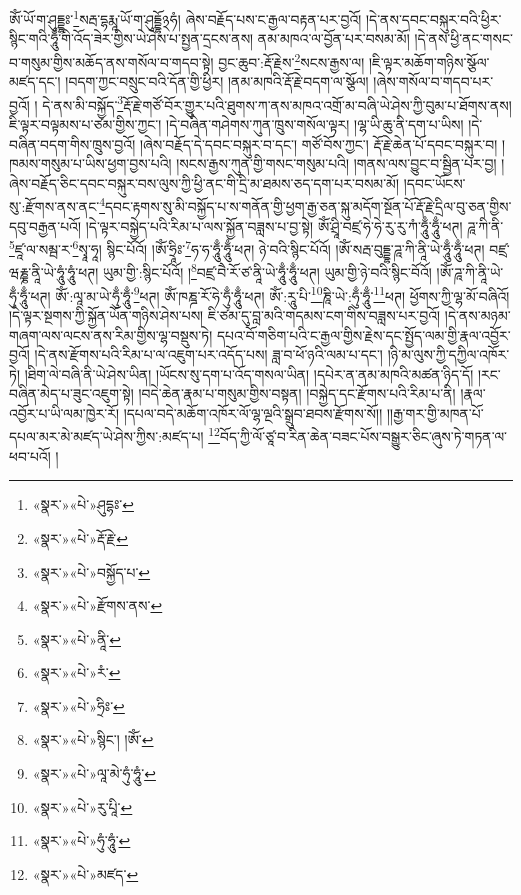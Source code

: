 ཨོཾ་ཡོ་ག་ཤུདྡྷཿ་\footnote{«སྣར་»«པེ་»ཤུདྷཿ་}སརྦ་དྷརྨཱ་ཡོ་ག་ཤུདྡྷོ྅ཧཾ། ཞེས་བརྗོད་པས་ང་རྒྱལ་བརྟན་པར་བྱའོ། །དེ་ནས་དབང་བསྐུར་བའི་ཕྱིར་སྙིང་གའི་ཧཱུྃ་གི་འོད་ཟེར་གྱིས་ཡེ་ཤེས་པ་སྤྱན་དྲངས་ནས། ནམ་མཁའ་ལ་བྱོན་པར་བསམ་མོ། །དེ་ནས་ཕྱི་ནང་གསང་བ་གསུམ་གྱིས་མཆོད་ནས་གསོལ་བ་གདབ་སྟེ། བྱང་ཆུབ་:རྡོ་རྗེས་\footnote{«སྣར་»«པེ་»རྡོ་རྗེ་}སངས་རྒྱས་ལ། །ཇི་ལྟར་མཆོག་གཉིས་སྩོལ་མཛད་དང་། །བདག་ཀྱང་བསྲུང་བའི་དོན་གྱི་ཕྱིར། །ནམ་མཁའི་རྡོ་རྗེ་བདག་ལ་སྩོལ། །ཞེས་གསོལ་བ་གདབ་པར་བྱའོ། །
དེ་ནས་མི་བསྐྱོད་\footnote{«སྣར་»«པེ་»བསྐྱོད་པ་}རྡོ་རྗེ་གཙོ་བོར་གྱུར་པའི་ཐུགས་ཀ་ནས་མཁའ་འགྲོ་མ་བཞི་ཡེ་ཤེས་ཀྱི་བུམ་པ་ཐོགས་ནས། ཇི་ལྟར་བལྟམས་པ་ཙམ་གྱིས་ཀྱང་། །དེ་བཞིན་གཤེགས་ཀུན་ཁྲུས་གསོལ་ལྟར། །ལྷ་ཡི་ཆུ་ནི་དག་པ་ཡིས། །དེ་བཞིན་བདག་གིས་ཁྲུས་བྱའོ། །ཞེས་བརྗོད་དེ་དབང་བསྐུར་བ་དང་། གཙོ་བོས་ཀྱང་། རྡོ་རྗེ་ཆེན་པོ་དབང་བསྐུར་བ། །ཁམས་གསུམ་པ་ཡིས་ཕྱག་བྱས་པའི། །སངས་རྒྱས་ཀུན་གྱི་གསང་གསུམ་པའི། །གནས་ལས་བྱུང་བ་སྦྱིན་པར་བྱ། །ཞེས་བརྗོད་ཅིང་དབང་བསྐུར་བས་ལུས་ཀྱི་ཕྱི་ནང་གི་དྲི་མ་ཐམས་ཅད་དག་པར་བསམ་མོ། །དབང་ཡོངས་སུ་:རྫོགས་ནས་ནང་\footnote{«སྣར་»«པེ་»རྫོགས་ནས་}དབང་རྟགས་སུ་མི་བསྐྱོད་པ་ས་གནོན་གྱི་ཕྱག་རྒྱ་ཅན་སྐུ་མདོག་སྔོན་པོ་རྡོ་རྗེ་དྲིལ་བུ་ཅན་གྱིས་དབུ་བརྒྱན་པའོ། །དེ་ལྟར་བསྐྱེད་པའི་རིམ་པ་ལས་སྐྱོན་བཟླས་པ་བྱ་སྟེ། ཨོཾ་ཤྲཱི་བཛྲ་ཧེ་ཧེ་རུ་རུ་ཀཾ་ཧཱུྃ་ཧཱུྃ་ཕཊ། ཌཱ་ཀི་ནི་\footnote{«སྣར་»«པེ་»ནཱི་}ཛཱ་ལ་སམྦ་ར་\footnote{«སྣར་»«པེ་»རཾ་}སྭཱ་ཧཱ། སྙིང་པོའོ། །ཨོཾ་ཧྲཱིཿ་\footnote{«སྣར་»«པེ་»ཧྲིཿ་}ཧ་ཧ་ཧཱུྃ་ཧཱུྃ་ཕཊ། ཉེ་བའི་སྙིང་པོའོ། །ཨོཾ་སརྦ་བུདྡྷ་ཌཱ་ཀི་ནཱི་ཡེ་ཧཱུྃ་ཧཱུྃ་ཕཊ། བཛྲ་ཝརྞྞ་ནཱི་ཡེ་ཧཱུཾ་ཧཱུཾ་ཕཊ། ཡུམ་གྱི་:སྙིང་པོའོ། །\footnote{«སྣར་»«པེ་»སྙིང་། །ཨོཾ་}བཛྲ་བཻ་རོ་ཙ་ནཱི་ཡེ་ཧཱུྃ་ཧཱུྃ་ཕཊ། ཡུམ་གྱི་ཉེ་བའི་སྙིང་བོའོ། །ཨོཾ་ཌཱ་ཀི་ནཱི་ཡེ་ཧུྃ་ཧཱུྃ་ཕཊ། ཨོཾ་:ལཱ་མ་ཡེ་ཧུྃ་ཧཱུྃ་\footnote{«སྣར་»«པེ་»ལཱ་མེ་ཧུཾ་ཧཱུཾ་}ཕཊ། ཨོཾ་ཁཎྜ་རོ་ཧེ་ཧུྃ་ཧཱུྃ་ཕཊ། ཨོཾ་:རཱུ་པི་\footnote{«སྣར་»«པེ་»རུ་པཱི་}ཎཱི་ཡེ་:ཧུྃ་ཧཱུྃ་\footnote{«སྣར་»«པེ་»ཧུཾ་ཧཱུཾ་}ཕཊ། ཕྱོགས་ཀྱི་ལྷ་མོ་བཞིའོ། །དེ་ལྟར་སྔགས་ཀྱི་སྐྱོན་ཡོན་གཉིས་ཤེས་པས། ཇི་ཙམ་དུ་བླ་མའི་གདམས་ངག་གིས་བཟླས་པར་བྱའོ། །དེ་ནས་མཉམ་གཞག་ལས་ལངས་ནས་རིམ་གྱིས་ལྷ་བསྡུས་ཏེ། དཔའ་བོ་གཅིག་པའི་ང་རྒྱལ་གྱིས་རྗེས་དང་སྤྱོད་ལམ་གྱི་རྣལ་འབྱོར་བྱའོ། །དེ་ནས་རྫོགས་པའི་རིམ་པ་ལ་འཇུག་པར་འདོད་པས། ཟླ་བ་ཕོ་ཉའི་ལམ་པ་དང་། །ཉི་མ་ལུས་ཀྱི་དཀྱིལ་འཁོར་ཏེ། །ཐིག་ལེ་བཞི་ནི་ཡེ་ཤེས་ཡིན། །ཡོངས་སུ་དག་པ་འོད་གསལ་ཡིན། །དཔེར་ན་ནམ་མཁའི་མཚན་ཉིད་དོ། །རང་བཞིན་མེད་པ་ཟུང་འཇུག་སྟེ། །བདེ་ཆེན་རྣམ་པ་གསུམ་གྱིས་བསྟན། །བསྐྱེད་དང་རྫོགས་པའི་རིམ་པ་ནི། །རྣལ་འབྱོར་པ་ཡི་ལམ་ཁྱེར་རོ། །དཔལ་བདེ་མཆོག་འཁོར་ལོ་ལྷ་ལྔའི་སྒྲུབ་ཐབས་རྫོགས་སོ།། །།རྒྱ་གར་གྱི་མཁན་པོ་དཔལ་མར་མེ་མཛད་ཡེ་ཤེས་ཀྱིས་:མཛད་པ། \footnote{«སྣར་»«པེ་»མཛད་}བོད་ཀྱི་ལོ་ཙཱ་བ་རིན་ཆེན་བཟང་པོས་བསྒྱུར་ཅིང་ཞུས་ཏེ་གཏན་ལ་ཕབ་པའོ། ། 